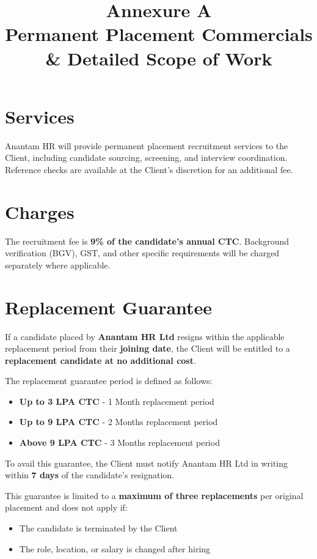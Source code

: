 \documentclass[12pt]{article}
\title{
\vspace{-1cm}
\textcolor{primary}{\Huge \textbf{Annexure A}} \\
\vspace{0.4cm}
\Large Permanent Placement Commercials \\
\Large \& Detailed Scope of Work
}
\date{}
\begin{document}
\maketitle
\thispagestyle{fancy}


\section{Services}

Anantam HR will provide permanent placement recruitment services to the Client, including candidate sourcing, screening, and interview coordination. Reference checks are available at the Client's discretion for an additional fee.

\section{Charges}

The recruitment fee is \textbf{9\% of the candidate's annual CTC}. Background verification (BGV), GST, and other specific requirements will be charged separately where applicable.

\section{Replacement Guarantee}

If a candidate placed by \textbf{Anantam HR Ltd} resigns within the applicable replacement period from their \textbf{joining date}, the Client will be entitled to a \textbf{replacement candidate at no additional cost}.

The replacement guarantee period is defined as follows:

\begin{itemize}[leftmargin=1.2cm]
\item \textbf{Up to 3 LPA CTC} - 1 Month replacement period
\item \textbf{Up to 9 LPA CTC} - 2 Months replacement period
\item \textbf{Above 9 LPA CTC} - 3 Months replacement period
\end{itemize}

To avail this guarantee, the Client must notify Anantam HR Ltd in writing within \textbf{7 days} of the candidate's resignation.

This guarantee is limited to a \textbf{maximum of three replacements} per original placement and does not apply if:

\begin{itemize}
\item The candidate is terminated by the Client
\item The role, location, or salary is changed after hiring
\end{itemize}
\end{document}
